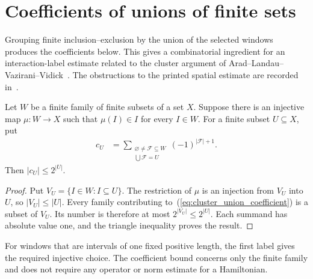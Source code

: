 \section{Coefficients of unions of finite sets}

Grouping finite inclusion--exclusion by the union of the selected windows
produces the coefficients below. This gives a combinatorial ingredient
for an interaction-label estimate related to the cluster argument
of Arad--Landau--Vazirani--Vidick~\cite[lines 1935--1968]{Arad2016RigorousRG}.
The obstructions to the printed spatial estimate are recorded
in~\cite{gap:alvv16_cluster_approximation}.

\begin{lemma}
    \label{thm:cluster_union_coefficient_bound}
    \leanok
    Let $W$ be a finite family of finite subsets of a set $X$. Suppose
    there is an injective map $\mu:W\to X$ such that $\mu(I)\in I$ for
    every $I\in W$. For a finite subset $U\subseteq X$, put
    \begin{align}
        c_U
         & =\sum_{\substack{\varnothing\ne\mathcal F\subseteq W \\
                \bigcup\mathcal F=U}}
        (-1)^{|\mathcal F|+1}.
        \label{eq:cluster_union_coefficient}
    \end{align}
    Then $|c_U|\leq2^{|U|}$.
\end{lemma}
\begin{proof}\leanok
    Put $V_U=\{I\in W:I\subseteq U\}$. The restriction of $\mu$ is an
    injection from $V_U$ into $U$, so $|V_U|\leq|U|$. Every family
    contributing to~(\ref{eq:cluster_union_coefficient}) is a subset of
    $V_U$. Its number is therefore at most $2^{|V_U|}\leq2^{|U|}$.
    Each summand has absolute value one, and the triangle inequality
    proves the result.
\end{proof}

For windows that are intervals of one fixed positive length, the first
label gives the required injective choice. The coefficient bound concerns
only the finite family and does not require any operator or norm estimate
for a Hamiltonian.
